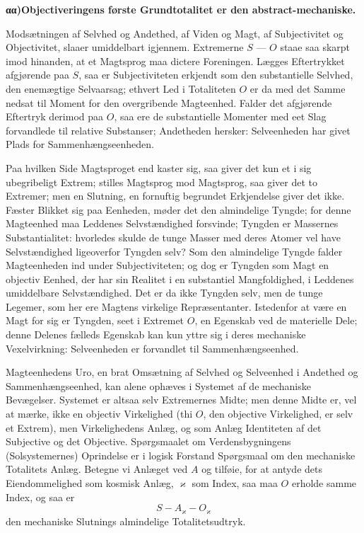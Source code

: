 \documentclass[12pt]{book}
\newcommand{\opage}[1]{\marginnote{\footnotesize\textit{[#1]}}}
\begin{document}
\begin{center}{\bfseries αα)\quad Objectiveringens første Grundtotalitet er den abstract-mechaniske.}\end{center}

Modsætningen af Selvhed og Andethed, af Viden og Magt, af Subjectivitet og Objectivitet, slaaer
umiddelbart igjennem. Extremerne $S$ — $O$ staae saa skarpt imod hinanden, at et Magtsprog maa dictere
Foreningen. Lægges Eftertrykket afgjørende paa $S$, saa er Subjectiviteten erkjendt som den
substantielle Selvhed, den enemægtige Selvaarsag; ethvert Led i Totaliteten $O$ er da med det Samme
nedsat til Moment for den overgribende Magteenhed. Falder det afgjørende Eftertryk derimod paa $O$,
saa ere de substantielle Momenter med eet Slag forvandlede til relative Substanser; Andetheden
hersker: Selveenheden har givet Plads for Sammenhængseenheden.

Paa hvilken Side Magtsproget end kaster sig, saa giver det kun et i sig ubegribeligt Extrem; stilles
Magtsprog mod Magtsprog, saa giver det to Extremer; men en Slutning, en fornuftig begrundet
Erkjendelse giver det ikke. Fæster Blikket sig paa Eenheden, møder det den almindelige Tyngde; for
denne Magteenhed maa Leddenes Selvstændighed forsvinde; Tyngden er Massernes Substantialitet:
hvorledes skulde de tunge Masser med deres Atomer vel have Selvstændighed ligeoverfor Tyngden selv?
Som den almindelige Tyngde falder Magteenheden ind under Subjectiviteten; og dog er Tyngden som Magt
en objectiv Eenhed, der har sin Realitet i en substantiel Mangfoldighed, i Leddenes umiddelbare
Selvstændighed. Det er da ikke Tyngden selv, men de tunge Legemer, som
\opage{436} her ere Magtens virkelige Repræsentanter. Istedenfor at være en Magt for sig er Tyngden, seet i
Extremet $O$, en Egenskab ved de materielle Dele; denne Delenes fælleds Egenskab kan kun yttre sig i
deres mechaniske Vexelvirkning: Selveenheden er forvandlet til Sammenhængseenhed.

Magteenhedens Uro, en brat Omsætning af Selvhed og Selveenhed i Andethed og Sammenhængseenhed, kan
alene ophæves i Systemet af de mechaniske Bevægelser. Systemet er altsaa selv Extremernes Midte; men
denne Midte er, vel at mærke, ikke en objectiv Virkelighed (thi $O$, den objective Virkelighed, er
selv et Extrem), men Virkelighedens Anlæg, og som Anlæg Identiteten af det Subjective og det
Objective. Spørgsmaalet om Verdensbygningens (Solsystemernes) Oprindelse er i logisk Forstand
Spørgsmaal om den mechaniske Totalitets Anlæg. Betegne vi Anlæget ved $A$ og tilføie, for at antyde
dets Eiendommelighed som kosmisk Anlæg, $\varkappa$ som Index, saa maa $O$ erholde samme Index, og saa
er
\[ S - A_{\varkappa} - O_{\varkappa} \]
den mechaniske Slutnings almindelige Totalitetsudtryk.
\end{document}
